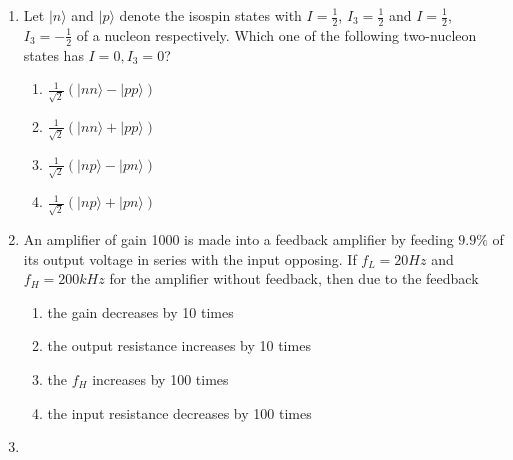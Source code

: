 \documentclass[journal]{IEEEtran}
\begin{document}
\begin{enumerate}[start=37]
Assuming an ideal voltage source. Thevenin's resistance and Thevenin's voltage respectively for the above circuit are 
\begin{multicols}{4}
\begin{enumerate}
    \item $15\ohm$ and 7.5\textbf{V}
    \item $20\ohm$ and 5\textbf{V}
    \item $10\ohm$ and 10\textbf{V}
    \item $30\ohm$ and 15\textbf{V}
\end{enumerate}
\end{multicols}
\item Let $ |n\rangle $ and $ |p\rangle $ denote the isospin states with $ I = \frac{1}{2} $, $ I_3 = \frac{1}{2} $ and $ I = \frac{1}{2} $, $ I_3 = -\frac{1}{2} $ of a nucleon respectively. Which one of the following two-nucleon states has $ I = 0, I_3 = 0 $?
\begin{multicols}{2}
\begin{enumerate}
    \item $ \frac{1}{\sqrt{2}} \left( | nn \rangle - | pp \rangle \right) $
    \item $ \frac{1}{\sqrt{2}} \left( | nn \rangle + | pp \rangle \right) $
    \item $ \frac{1}{\sqrt{2}} \left( | np \rangle - | pn \rangle \right) $
    \item $ \frac{1}{\sqrt{2}} \left( | np \rangle + | pn \rangle \right) $
\end{enumerate}
\end{multicols}
\item An amplifier of gain 1000 is made into a feedback amplifier by feeding $9.9\%$ of its output voltage in series with the input opposing. If $f_{L}=20Hz$ and $f_{H}=200kHz$ for the amplifier without feedback, then due to the feedback
\begin{enumerate}
    \item the gain decreases by 10 times
    \item the output resistance increases by 10 times
    \item the $f_{H}$ increases by 100 times
    \item the input resistance decreases by 100 times
\end{enumerate}
\item \hspace{1cm}

\begin{figure}[H]
\centering
{}
\end{figure}
\end{enumerate}
\end{document}
